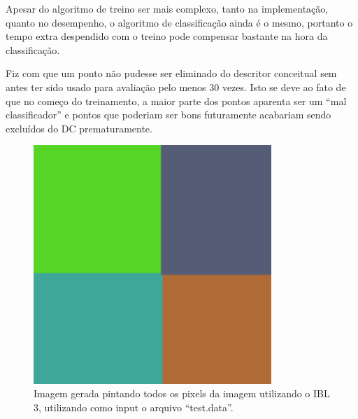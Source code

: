 \documentclass[12pt]{article}
\begin{document}
Apesar do algoritmo de treino ser mais complexo, tanto na implementação, quanto no desempenho, o algoritmo de classificação ainda é o mesmo, portanto o tempo extra despendido com o treino pode compensar bastante na hora da classificação.

Fiz com que um ponto não pudesse ser eliminado do descritor conceitual sem antes ter sido usado para avaliação pelo menos 30 vezes. Isto se deve ao fato de que no começo do treinamento, a maior parte dos pontos aparenta ser um ``mal classificador'' e pontos que poderiam ser bons futuramente acabariam sendo excluídos do DC prematuramente.

\begin{figure}[hb]
	\center
	\includegraphics[width=9cm]{./outputs/square.png}
	\caption{Imagem gerada pintando todos os pixels da imagem utilizando o IBL 3, utilizando como input o arquivo ``test.data''.}
\end{figure}
\end{document}
